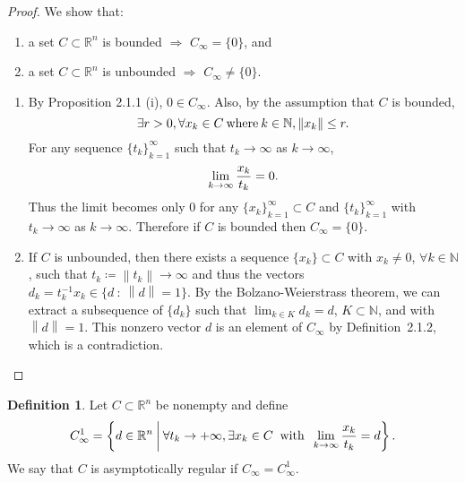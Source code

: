 \documentclass[a4paper,11pt, oneside]{book}
\theoremstyle{definition}
\newtheorem{dfn}[thm]{Definition}
\newcommand{\NaturalNumberSet}{\mathbb{N}}
\newcommand{\NDemenstionalRealEuclideanSpace}{\mathbb{R}^n}
\begin{document}
\begin{proof}
  We show that:

  \begin{enumerate}[label=\roman*,align=CenterWithParen]
    \item a set $C \subset \NDemenstionalRealEuclideanSpace$ is bounded $\Rightarrow $ $C_{\infty} = \{0\}$, and
    \item a set $C \subset \NDemenstionalRealEuclideanSpace$ is unbounded $\Rightarrow $ $C_{\infty} \ne \{0\}$.
  \end{enumerate}

  \begin{enumerate}[label=\roman*,align=CenterWithParen]
    \item By Proposition 2.1.1 (i), $0 \in C_{\infty}$. Also, by the assumption that $C$ is bounded,
    \begin{equation}
      \exists r > 0, \forall x_k \in C \:\text{where}\: k \in \NaturalNumberSet,  \left\lVert x_k \right\rVert \leq r. \notag
    \end{equation}
    For any sequence $\{t_k\}_{k=1}^{\infty}$ such that $t_k \rightarrow \infty$ as $k \rightarrow \infty$,
    \begin{equation}
      \lim_{k \to \infty} \frac{x_k}{t_k} = 0. \notag
    \end{equation}
    Thus the limit becomes only 0 for any $\{x_k\}_{k=1}^{\infty} \subset C$ and $\{t_k\}_{k=1}^{\infty}$ with $t_k \rightarrow \infty$ as $k \rightarrow \infty$. Therefore if $C$ is bounded then $C_{\infty} = \{0\}$.

    \item If $C$ is unbounded, then there exists a sequence $\{x_k\} \subset C$ with $x_k \ne 0$, $\forall k \in \NaturalNumberSet$, such that $t_k \coloneqq \left\lVert t_k \right\rVert \rightarrow \infty$ and thus the vectors $d_k = t_k^{-1} x_k \in \{ d \:\colon\: \left\lVert d\right\rVert = 1 \}$. By the Bolzano-Weierstrass theorem, we can extract a subsequence of $\{d_k\}$ such that $\lim_{k \in K} d_k = d$, $K \subset \NaturalNumberSet$, and with $\left\lVert d \right\rVert = 1$. This nonzero vector $d$ is an element of $C_{\infty}$ by Definition~2.1.2, which is a contradiction.
  \end{enumerate}
\end{proof}

\begin{dfn}
  Let $C \subset \NDemenstionalRealEuclideanSpace$ be nonempty and define
  \begin{equation}
    C_{\infty}^1 = \left\{d \in \NDemenstionalRealEuclideanSpace \:\middle|\: \forall t_k \rightarrow + \infty , \exists x_k \in C \:\text{ with }\: \lim_{k \to \infty} \frac{x_k}{t_k} = d \right\}. \notag
  \end{equation}
  We say that $C$ is asymptotically regular if $C_{\infty} = C_{\infty}^1$.
\end{dfn}
\end{document}
